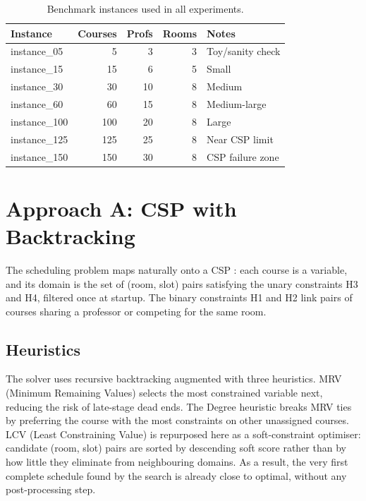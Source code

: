 \documentclass[letterpaper]{article}
\begin{document}
\begin{table}[h]
\centering
\caption{Benchmark instances used in all experiments.}
\label{tab:instances}
\small
\begin{tabular}{@{}lrrrl@{}}
\toprule
Instance & Courses & Profs & Rooms & Notes \\
\midrule
instance\_05  &   5 &  3 &  3 & Toy/sanity check \\
instance\_15  &  15 &  6 &  5 & Small \\
instance\_30  &  30 & 10 &  8 & Medium \\
instance\_60  &  60 & 15 &  8 & Medium-large \\
instance\_100 & 100 & 20 &  8 & Large \\
instance\_125 & 125 & 25 &  8 & Near CSP limit \\
instance\_150 & 150 & 30 &  8 & CSP failure zone \\
\bottomrule
\end{tabular}
\end{table}

\section{Approach A: CSP with Backtracking}

The scheduling problem maps naturally onto a CSP \cite{russell2020}: each course is a variable, and its domain is the set of (room, slot) pairs satisfying the unary constraints H3 and H4, filtered once at startup. The binary constraints H1 and H2 link pairs of courses sharing a professor or competing for the same room.

\subsection{Heuristics}

The solver uses recursive backtracking augmented with three heuristics. MRV (Minimum Remaining Values) selects the most constrained variable next, reducing the risk of late-stage dead ends. The Degree heuristic breaks MRV ties by preferring the course with the most constraints on other unassigned courses. LCV (Least Constraining Value) is repurposed here as a soft-constraint optimiser: candidate (room, slot) pairs are sorted by descending soft score rather than by how little they eliminate from neighbouring domains. As a result, the very first complete schedule found by the search is already close to optimal, without any post-processing step.
\end{document}
